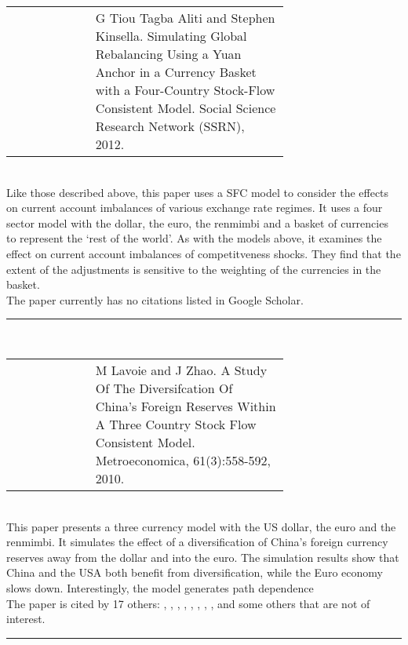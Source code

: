 \documentclass[twoside,a4paper,11pt]{article}
\begin{document}
 \begin{tabular}{lp{0.7\linewidth}}
\cite{Aliti2012a}  & G Tiou Tagba Aliti and Stephen Kinsella. Simulating Global Rebalancing Using a
Yuan Anchor in a Currency Basket with a Four-Country Stock-Flow Consistent Model.
Social Science Research Network (SSRN), 2012.
\end{tabular}\\[5pt]
Like those described above, this paper uses a SFC model to consider the effects on current account imbalances of various exchange rate regimes. It uses a four sector model with the dollar, the euro, the renmimbi and a basket of currencies to represent the `rest of the world'. As with the models above, it examines the effect on current account imbalances of competitveness shocks. They find that the extent of the adjustments is sensitive to the weighting of the currencies in the basket.\\[5pt]
The paper currently has no citations listed in Google Scholar.
\begin{center}
\rule{10cm}{1pt}  \\[5pt]
\end{center}

\begin{tabular}{lp{0.7\linewidth}}
\cite{Lavoie2010a}  &  M Lavoie and J Zhao. A Study Of The Diversifcation Of China's Foreign Reserves
Within A Three Country Stock Flow Consistent Model. Metroeconomica, 61(3):558-592, 2010.
\end{tabular}\\[5pt]
This paper presents a three currency model with the US dollar, the euro and the renmimbi. It simulates the effect of a diversification of China's foreign currency reserves away from the dollar and into the euro. The simulation results show that China and the USA both benefit from diversification, while the Euro economy slows down. Interestingly, the model generates path dependence \\[5pt]
The paper is cited by 17 others:
  \cite{Caverzasi2013},
  \cite{Caverzasi2014a},
  \cite{Mazier2012b}, 
  \cite{Mazier2013a},
  \cite{Mazier2015},
  \cite{Kinsella2012a},
  \cite{Valdecantos2015b},
  \cite{Halporn2012},
  and some others that are not of interest.
\begin{center}
\rule{10cm}{1pt}   \\[5pt]
\end{center}
\end{document}
